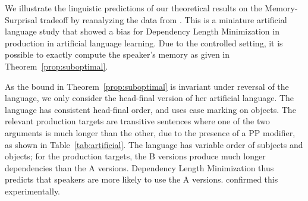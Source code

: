 

We illustrate the linguistic predictions of our theoretical results on the Memory-Surprisal tradeoff by reanalyzing the data from \cite{fedzechkina-human-2017}.
This is a miniature artificial language study that showed a bias for Dependency Length Minimization in production in artificial language learning.
Due to the controlled setting, it is possible to exactly compute the speaker's memory as given in Theorem~\ref{prop:suboptimal}.


As the bound in Theorem~\ref{prop:suboptimal} is invariant under reversal of the language, we only consider the head-final version of her artificial language.
The language has consistent head-final order, and uses case marking on objects.
The relevant production targets are transitive sentences where one of the two arguments is much longer than the other, due to the presence of a PP modifier, as shown in Table~\ref{tab:artificial}.
The language has variable order of subjects and objects; for the production targets, the B versions produce much longer dependencies than the A versions.
Dependency Length Minimization thus predicts that speakers are more likely to use the A versions.
\cite{fedzechkina-human-2017} confirmed this experimentally.


